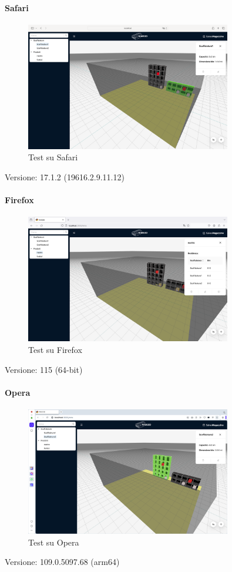 \paragraph{Safari}
\begin{figure}[h!] 
    \centering
    \includegraphics[width=0.8\textwidth]{images/safari.png}
    \caption{Test su Safari}
\end{figure}
Versione: 17.1.2 (19616.2.9.11.12)


\paragraph{Firefox}
\begin{figure}[h!] 
    \centering
    \includegraphics[width=0.8\textwidth]{images/firefox.png}
    \caption{Test su Firefox}
\end{figure}
Versione: 115 (64-bit)

\paragraph{Opera}
\begin{figure}[h!] 
    \centering
    \includegraphics[width=0.8\textwidth]{images/opera.png}
    \caption{Test su Opera}
\end{figure}
Versione: 109.0.5097.68 (arm64)

